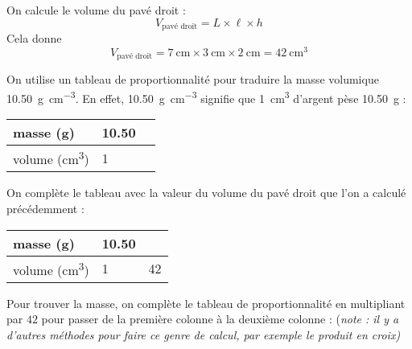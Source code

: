 \documentclass[../Cours.tex]{subfiles}
\begin{document}
\begin{questions}
    On calcule le volume du pavé droit : 
    $$V_{\mbox{pavé droit}} = L \times \ell \times h$$
    Cela donne 
    $$V_{\mbox{pavé droit}} = \qty{7}{\cm} \times \qty{3}{\cm} \times \qty{2}{\cm} = \qty{42}{\cm\cubed}$$

    On utilise un tableau de proportionnalité pour traduire la masse volumique \qty{10,50}{\g\per\cm\cubed}. En effet, \qty{10,50}{\g\per\cm\cubed} signifie que \qty{1}{\cm\cubed} d'argent pèse \qty{10,50}{\g} :

    \begin{center}
    \begin{tabularx}{0.4\linewidth}{|l|X|X|}\hline
        masse (\unit{\g}) & \num{10,50} & \\\hline
        volume (\unit{\cm\cubed}) & \num{1} & \\\hline
    \end{tabularx}
    \end{center}

    On complète le tableau avec la valeur du volume du pavé droit que l'on a calculé précédemment :
    
    \begin{center}
    \begin{tabularx}{0.4\linewidth}{|l|X|X|}\hline
        masse (\unit{\g}) & \num{10,50} & \\\hline
        volume (\unit{\cm\cubed}) & \num{1} & \num{42} \\\hline
    \end{tabularx}
    \end{center}

    Pour trouver la masse, on complète le tableau de proportionnalité en multipliant par $42$ pour passer de la première colonne à la deuxième colonne : (\textit{note : il y a d'autres méthodes pour faire ce genre de calcul, par exemple le produit en croix)}

    \begin{center}
    \end{center}


\end{questions}
\end{document}
